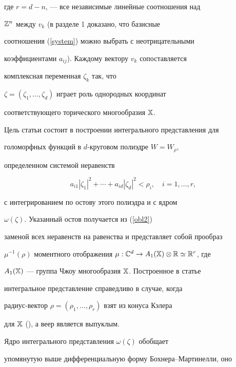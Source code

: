 где $r=d-n$, --- все независимые линейные соотношения над


$\Bbb{Z}^n$ между $v_k$ (в разделе 1 доказано, что базисные


соотношения (\ref{system}) можно выбрать с неотрицательными


коэффициентами $a_{ij}$). Каждому вектору $v_k$ сопоставляется


комплексная переменная $\zeta_k$ так, что


$\zeta=(\zeta_1,\dotsc,\zeta_d)$ играет роль однородных координат


соответствующего торического многообразия ${\Bbb X}$. 





Цель статьи состоит в построении интегрального представления для


голоморфных функций в $d$-круговом полиэдре $W=W_{\rho}$,


определенном системой неравенств


\begin{equation}


a_{i1}|\zeta_1|^2+\dotsb+a_{id}|\zeta_d|^2<\rho_i,\quad i=1,\dotsc,r,


\label{obl2}


\end{equation}


с интегрированием по остову этого полиэдра и с ядром


$\omega(\zeta)$. Указанный остов получается из (\ref{obl2})


заменой всех неравенств на равенства и представляет собой прообраз


$\mu^{-1}(\rho)$ моментного отображения $\mu:\Bbb{C}^d\to


A_1(\Bbb{X})\otimes \Bbb{R}\simeq\Bbb{R}^r$, где


$A_1(\Bbb{X})$ --- группа Чжоу многообразия $\Bbb{X}$. Построенное в статье


интегральное представление справедливо в случае, когда 


радиус-вектор $\rho=(\rho_1,\dotsc,\rho_r)$ взят из конуса  Кэлера 


для $\Bbb{X}$ (\cite{Cox1}), а  веер является выпуклым.





Ядро интегрального представления $\omega(\zeta)$ обобщает


упомянутую выше дифференциальную форму Бохнера--Мартинелли, оно


